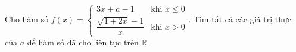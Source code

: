 \begin{ex}
Cho hàm số $f(x)=\begin{cases}3x+a-1&\text{khi }x\le0\\\dfrac{\sqrt{1+2x}-1}x&\text{khi }x>0\end{cases}$. Tìm tất cả các giá trị thực của $a$ để hàm số đã cho liên tục trên $\mathbb R$.
\end{ex}
